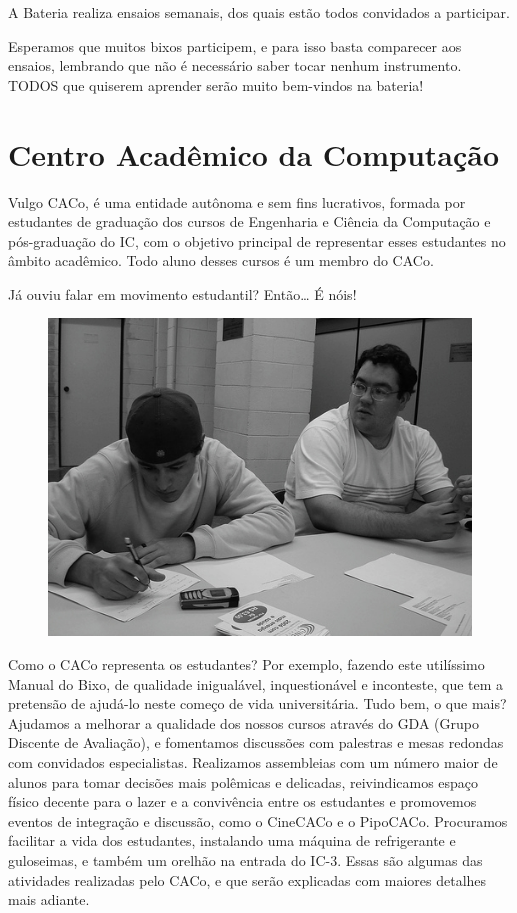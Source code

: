A Bateria realiza ensaios semanais, dos quais estão todos convidados a
participar.

Esperamos que muitos bixos participem, e para isso basta comparecer aos ensaios,
lembrando que não é necessário saber tocar nenhum instrumento. TODOS que
quiserem aprender serão muito bem-vindos na bateria!

\section{Centro Acadêmico da Computação}

Vulgo CACo, é uma entidade autônoma e sem fins
lucrativos, formada por estudantes de graduação dos cursos de Engenharia
e Ciência da Computação e pós-graduação do IC, com o objetivo principal de
representar esses estudantes no âmbito acadêmico. Todo aluno desses cursos é um
membro do CACo.

Já ouviu falar em movimento estudantil? Então{\dots} É nóis!
\begin{figure}[h!]
    \vspace{-10pt}
    \centering
    \includegraphics[scale=0.58, keepaspectratio=true]{img/imgs/21-CACo/-123.jpg}
    \vspace{-10pt}
\end{figure}

Como o CACo representa os estudantes? Por exemplo, fazendo este utilíssimo
Manual do Bixo, de qualidade inigualável, inquestionável e inconteste, que tem
a pretensão de ajudá-lo neste começo de vida universitária. Tudo bem, o que
mais? Ajudamos a melhorar a qualidade dos nossos cursos através do GDA (Grupo
Discente de Avaliação), e fomentamos discussões com palestras e mesas redondas
com convidados especialistas. Realizamos assembleias com um número maior de
alunos para tomar decisões mais polêmicas e delicadas, reivindicamos espaço
físico decente para o lazer e a convivência entre os estudantes e promovemos
eventos de integração e discussão, como o CineCACo e o PipoCACo. Procuramos
facilitar a vida dos estudantes, instalando uma máquina de refrigerante
e guloseimas, e também um orelhão na entrada do IC-3. 
Essas são algumas das atividades realizadas pelo CACo, e que serão explicadas
com maiores detalhes mais adiante.

